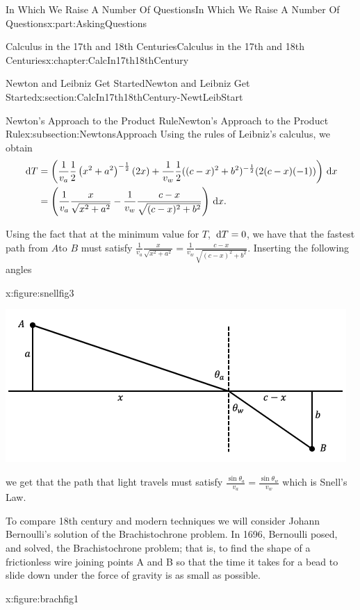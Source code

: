 \documentclass[oneside,10pt,]{book}
\numberwithin{equation}{section}
\newcommand{\dx}[1]{\,{\rm d}#1}
\newcommand{\amp}{&}
\begin{document}
\begin{partptx}{In Which We Raise A Number Of Questions}{}{In Which We Raise A Number Of Questions}{}{}{x:part:AskingQuestions}
\begin{chapterptx}{Calculus in the 17th and 18th Centuries}{}{Calculus in the 17th and 18th Centuries}{}{}{x:chapter:CalcIn17th18thCentury}
\begin{sectionptx}{Newton and Leibniz Get Started}{}{Newton and Leibniz Get Started}{}{}{x:section:CalcIn17th18thCentury-NewtLeibStart}
\begin{subsectionptx}{Newton's Approach to the Product Rule}{}{Newton's Approach to the Product Rule}{}{}{x:subsection:NewtonsApproach}
Using the rules of Leibniz's calculus, we obtain%
\begin{align*}
\dx{ T}\amp = \left(\frac{1}{v_a}\frac{1}{2}\left(x^2+a^2\right)^{-\frac{1}{2}} (2x)+\frac{1}{v_w}\frac{1}{2}((c-x)^2+b^2)^{-\frac{1}{2}}(2(c-x)(-1))\right) \dx{ x}\\
\amp =\left(\frac{1}{v_a}\frac{x}{\sqrt{x^2+a^2}}-\frac{1}{v_w}\frac{c-x}{\sqrt{(c-x)^2+b^2}}\right)\dx{ x}\text{.}
\end{align*}
%
\par
Using the fact that at the minimum value for \(T\), \(\dx{ T}=0\), we have that the fastest path from \(A\)to \(B\) must satisfy \(\frac{1}{v_a}\frac{x}{\sqrt{x^2+a^2}}=\frac{1}{v_w}\frac{c-x}{\sqrt{(c-x)^2+b^2}}\). Inserting the following angles%
\begin{figureptx}{}{x:figure:snellfig3}{}%
\begin{image}{0.125}{0.75}{0.125}%
\includegraphics[width=\linewidth]{images/snellfig3.png}
\end{image}%
\tcblower
\end{figureptx}%
we get that the path that light travels must satisfy \(\frac{\sin\theta_a}{v_a}=\frac{\sin\theta_w}{v_w}\) which is Snell's Law.%
\par
{} To compare 18th century and modern techniques we will consider Johann Bernoulli's solution of the Brachistochrone problem. In 1696, Bernoulli posed, and solved, the Brachistochrone problem; that is, to find the shape of a frictionless wire joining points A and B so that the time it takes for a bead to slide down under the force of gravity is as small as possible.%
\begin{figureptx}{}{x:figure:brachfig1}{}%
\begin{image}{0.125}{0.75}{0.125}%

\end{image}
\end{figureptx}
\end{subsectionptx}
\end{sectionptx}
\end{chapterptx}
\end{partptx}
\end{document}
